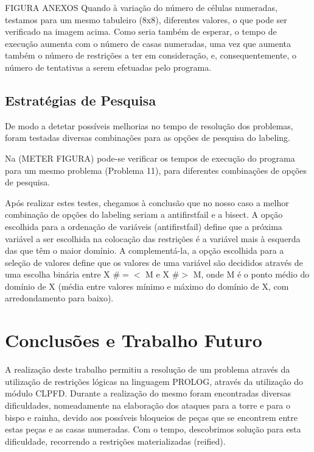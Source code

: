 \documentclass[runningheads]{llncs}
\begin{document}
FIGURA ANEXOS
Quando à variação do número de células numeradas, testamos para um mesmo tabuleiro (8x8), diferentes valores, o que pode ser verificado na imagem acima.
Como seria também de esperar, o tempo de execução aumenta com o número de casas numeradas, uma vez que aumenta também o número de restrições a ter em consideração, e, consequentemente, o número de tentativas a serem efetuadas pelo programa.

\subsection{Estratégias de Pesquisa}

De modo a detetar possíveis melhorias no tempo de resolução dos problemas, foram testadas diversas combinações para as opções de pesquisa do labeling. 

Na (METER FIGURA) pode-se verificar os tempos de execução do programa para um mesmo problema (Problema 11), para diferentes combinações de opções de pesquisa.

Após realizar estes testes, chegamos à conclusão que no nosso caso a melhor combinação de opções do labeling seriam a anti\textunderscore first\textunderscore fail e
 a bisect.
A opção escolhida para a ordenação de variáveis (anti\textunderscore first\textunderscore fail) define que a próxima variável a ser escolhida na colocação 
das restrições é a variável mais à esquerda das que têm o maior domínio.
A complementá-la, a opção escolhida para a seleção de valores define que os valores de uma 
variável são decididos através de uma escolha binária entre X  \#$=<$ M e X  \#$>$ M, onde M 
é o ponto médio do domínio de X (média entre valores mínimo e máximo do domínio de X, 
com arredondamento para baixo).

\newpage
\section{Conclusões e Trabalho Futuro}

A realização deste trabalho permitiu a resolução de um problema através da utilização de restrições lógicas na linguagem PROLOG,
através da utilização do módulo CLPFD.
Durante a realização do mesmo foram encontradas diversas dificuldades, nomeadamente na elaboração dos ataques para a torre e para o bispo e rainha, devido aos possíveis bloqueios de peças que se encontrem entre estas peças e as casas numeradas.
Com o tempo, descobrimos solução para esta dificuldade, recorrendo a restrições materializadas (reified).
\end{document}
